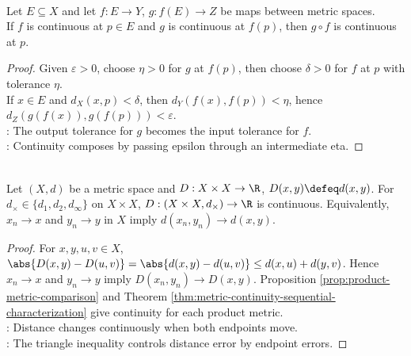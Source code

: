 \begin{theorem} \label{thm:continuous-composition} \\
Let $E\subseteq X$ and let $f:E\to Y$, $g:f(E)\to Z$ be maps between metric spaces.\\
If $f$ is continuous at $p\in E$ and $g$ is continuous at $f(p)$, then $g\circ f$ is continuous at $p$.
\begin{proof}
Given $\varepsilon>0$, choose $\eta>0$ for $g$ at $f(p)$, then choose $\delta>0$ for $f$ at $p$ with tolerance $\eta$.\\
If $x\in E$ and $d_X(x,p)<\delta$, then $d_Y(f(x),f(p))<\eta$, hence $d_Z(g(f(x)),g(f(p)))<\varepsilon$.\\
: The output tolerance for $g$ becomes the input tolerance for $f$.\\
: Continuity composes by passing epsilon through an intermediate eta.
\end{proof}
\end{theorem}

\begin{theorem} \label{thm:distance-function-is-continuous} \\
Let $(X,d)$ be a metric space and $D:X\times X\to\R$, $D(x,y)\defeq d(x,y)$. For $d_\times\in\{d_1,d_2,d_\infty\}$ on $X\times X$, $D:(X\times X,d_\times)\to\R$ is continuous. Equivalently, $x_n\to x$ and $y_n\to y$ in $X$ imply $d(x_n,y_n)\to d(x,y)$.
\begin{proof}
For $x,y,u,v\in X$, $\abs{D(x,y)-D(u,v)}=\abs{d(x,y)-d(u,v)}\leq d(x,u)+d(y,v)$. Hence $x_n\to x$ and $y_n\to y$ imply $D(x_n,y_n)\to D(x,y)$. Proposition \ref{prop:product-metric-comparison} and Theorem \ref{thm:metric-continuity-sequential-characterization} give continuity for each product metric.\\
: Distance changes continuously when both endpoints move.\\
: The triangle inequality controls distance error by endpoint errors.
\end{proof}
\end{theorem}

